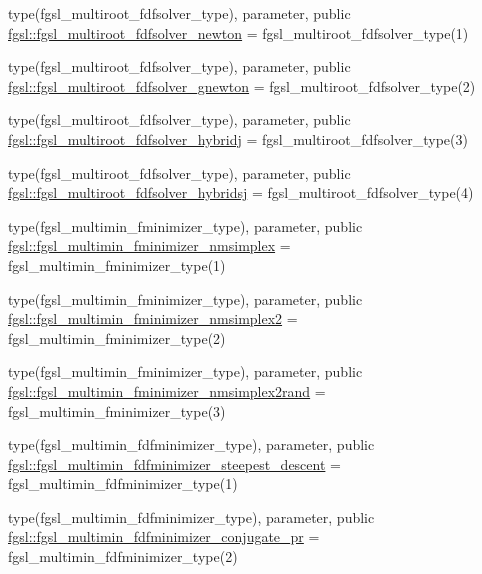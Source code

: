 \begin{DoxyCompactItemize}
\item 
type(fgsl\+\_\+multiroot\+\_\+fdfsolver\+\_\+type), parameter, public \hyperlink{namespacefgsl_ae80cc34511a1cc786b0fb5617e3929ed}{fgsl\+::fgsl\+\_\+multiroot\+\_\+fdfsolver\+\_\+newton} = fgsl\+\_\+multiroot\+\_\+fdfsolver\+\_\+type(1)
\item 
type(fgsl\+\_\+multiroot\+\_\+fdfsolver\+\_\+type), parameter, public \hyperlink{namespacefgsl_a4ecb43f393dacc9cefa731f8aec97f40}{fgsl\+::fgsl\+\_\+multiroot\+\_\+fdfsolver\+\_\+gnewton} = fgsl\+\_\+multiroot\+\_\+fdfsolver\+\_\+type(2)
\item 
type(fgsl\+\_\+multiroot\+\_\+fdfsolver\+\_\+type), parameter, public \hyperlink{namespacefgsl_a3a3728bb3d1d1a699c08a4a02af2eac1}{fgsl\+::fgsl\+\_\+multiroot\+\_\+fdfsolver\+\_\+hybridj} = fgsl\+\_\+multiroot\+\_\+fdfsolver\+\_\+type(3)
\item 
type(fgsl\+\_\+multiroot\+\_\+fdfsolver\+\_\+type), parameter, public \hyperlink{namespacefgsl_a4d6c0533915b025bbb86fb16727964ca}{fgsl\+::fgsl\+\_\+multiroot\+\_\+fdfsolver\+\_\+hybridsj} = fgsl\+\_\+multiroot\+\_\+fdfsolver\+\_\+type(4)
\item 
type(fgsl\+\_\+multimin\+\_\+fminimizer\+\_\+type), parameter, public \hyperlink{namespacefgsl_ab2e841755e0db0b740c913a9ca231417}{fgsl\+::fgsl\+\_\+multimin\+\_\+fminimizer\+\_\+nmsimplex} = fgsl\+\_\+multimin\+\_\+fminimizer\+\_\+type(1)
\item 
type(fgsl\+\_\+multimin\+\_\+fminimizer\+\_\+type), parameter, public \hyperlink{namespacefgsl_a360e9e8ff70d499aedd5dbbdbdfd8404}{fgsl\+::fgsl\+\_\+multimin\+\_\+fminimizer\+\_\+nmsimplex2} = fgsl\+\_\+multimin\+\_\+fminimizer\+\_\+type(2)
\item 
type(fgsl\+\_\+multimin\+\_\+fminimizer\+\_\+type), parameter, public \hyperlink{namespacefgsl_a1d64d873582c83a3e43c44d10ada296e}{fgsl\+::fgsl\+\_\+multimin\+\_\+fminimizer\+\_\+nmsimplex2rand} = fgsl\+\_\+multimin\+\_\+fminimizer\+\_\+type(3)
\item 
type(fgsl\+\_\+multimin\+\_\+fdfminimizer\+\_\+type), parameter, public \hyperlink{namespacefgsl_a30855ab98d924e9fa284bc2d50170b82}{fgsl\+::fgsl\+\_\+multimin\+\_\+fdfminimizer\+\_\+steepest\+\_\+descent} = fgsl\+\_\+multimin\+\_\+fdfminimizer\+\_\+type(1)
\item 
type(fgsl\+\_\+multimin\+\_\+fdfminimizer\+\_\+type), parameter, public \hyperlink{namespacefgsl_a8ac392b0c99b65482d4a3f6a8f719ed6}{fgsl\+::fgsl\+\_\+multimin\+\_\+fdfminimizer\+\_\+conjugate\+\_\+pr} = fgsl\+\_\+multimin\+\_\+fdfminimizer\+\_\+type(2)

\end{DoxyCompactItemize}
